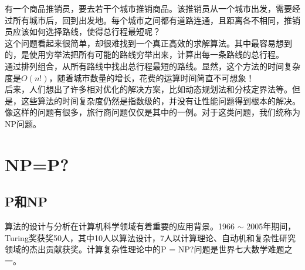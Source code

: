 有一个商品推销员，要去若干个城市推销商品。该推销员从一个城市出发，需要经过所有城市后，回到出发地。每个城市之间都有道路连通，且距离各不相同，推销员应该如何选择路线，使得总行程最短呢？ \\

这个问题看起来很简单，却很难找到一个真正高效的求解算法。其中最容易想到的，是使用穷举法把所有可能的路线穷举出来，计算出每一条路线的总行程。 \\

通过排列组合，从所有路线中找出总行程最短的路线。显然，这个方法的时间复杂度是$ O(n!) $，随着城市数量的增长，花费的运算时间简直不可想象！ \\

后来，人们想出了许多相对优化的解决方案，比如动态规划法和分枝定界法等。但是，这些算法的时间复杂度仍然是指数级的，并没有让性能问题得到根本的解决。 \\

像这样的问题有很多，旅行商问题仅仅是其中的一例。对于这类问题，我们统称为NP问题。

\newpage

\section{NP=P?}

\subsection{P和NP}

算法的设计与分析在计算机科学领域有着重要的应用背景。1966 $ \sim $ 2005年期间，Turing奖获奖50人，其中10人以算法设计，7人以计算理论、自动机和复杂性研究领域的杰出贡献获奖。计算复杂性理论中的P = NP?问题是世界七大数学难题之一。

\begin{table}[H]
    \centering
    \caption{常见算法时间复杂度}
\end{table}


